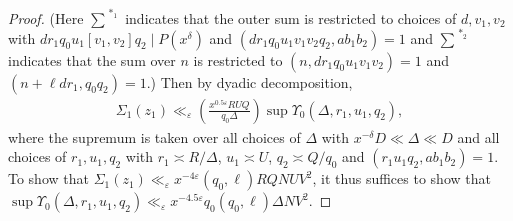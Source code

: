 \documentclass{amsart}
\numberwithin{equation}{section}
\begin{document}
\begin{proof}
\vspace{-3mm} 
(Here $\sum\limits^{\,\,*_1}$ indicates that the outer sum is restricted to choices of $ d,  v_1, v_2$ with  $dr_1q_0u_1[v_1,v_2]q_2  \mid P(x^\delta)$ and $(dr_1q_0u_1v_1v_2q_2,ab_1b_2)=1$ and $\sum\limits^{\,\,*_2}$ indicates that the sum over $n$ is restricted to $(n,dr_1q_0u_1v_1v_2  )=1$ and $(n+\ell dr_1, q_0q_2)=1$.)
Then by dyadic decomposition, \begin{align*}
\Sigma_1(z_1) \ll_\varepsilon \left(\frac{x^{0.5\varepsilon} RUQ}{q_0 \Delta} \right) \sup \Upsilon_0 (\Delta,r_1,u_1,q_2),
\end{align*}
where the supremum is taken over all choices of $\Delta$ with $x^{-\delta}D \ll \Delta \ll D$ and all choices of $r_1, u_1, q_2$ with $r_1 \asymp R/\Delta$, $u_1 \asymp U$, $q_2 \asymp Q/q_0$ and $(r_1u_1q_2,ab_1b_2)=1$. To show that $\Sigma_1(z_1) \ll_{\varepsilon}x^{-4\varepsilon}(q_0,\ell)RQNUV^2$, it thus suffices to show that $\sup \Upsilon_0  (\Delta,r_1,u_1,q_2) \ll_{\varepsilon} x^{-4.5\varepsilon}q_0(q_0,\ell)\Delta N V^2 $.
  
 


\end{proof}
\end{document}

